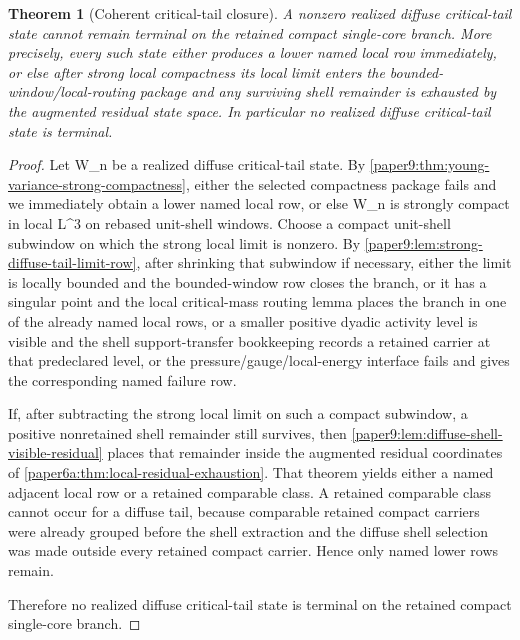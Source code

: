 \documentclass[11pt]{amsart}
\def\({}%
\def\){}%
\theoremstyle{plain}
\newtheorem{theorem}{Theorem}[section]
\theoremstyle{definition}
\theoremstyle{remark}
\begin{document}
\begin{theorem}[Coherent critical-tail closure]
\label{paper9:thm:coherent-critical-tail-closure}
A nonzero realized diffuse critical-tail state cannot remain terminal on the
retained compact single-core branch.  More precisely, every such state either
produces a lower named local row immediately, or else after strong local
compactness its local limit enters the bounded-window/local-routing package and
any surviving shell remainder is exhausted by the augmented residual state space.
In particular no realized diffuse critical-tail state is terminal.
\end{theorem}

\begin{proof}
Let \(W_n\) be a realized diffuse critical-tail state.  By
\cref{paper9:thm:young-variance-strong-compactness}, either the selected
compactness package fails and we immediately obtain a lower named local row, or
else \(W_n\) is strongly compact in local \(L^3\) on rebased unit-shell
windows.  Choose a compact unit-shell subwindow on which the strong local limit
is nonzero.  By \cref{paper9:lem:strong-diffuse-tail-limit-row}, after shrinking
that subwindow if necessary, either the limit is locally bounded and the
bounded-window row closes the branch, or it has a singular point and the local
critical-mass routing lemma places the branch in one of the already named local
rows, or a smaller positive dyadic activity level is visible and the shell
support-transfer bookkeeping records a retained carrier at that predeclared
level, or the pressure/gauge/local-energy interface fails and gives the
corresponding named failure row.

If, after subtracting the strong local limit on such a compact subwindow, a
positive nonretained shell remainder still survives, then
\cref{paper9:lem:diffuse-shell-visible-residual} places that remainder inside the
augmented residual coordinates of
\cref{paper6a:thm:local-residual-exhaustion}.  That theorem yields either a
named adjacent local row or a retained comparable class.  A retained comparable
class cannot occur for a diffuse tail, because comparable retained compact
carriers were already grouped before the shell extraction and the diffuse shell
selection was made outside every retained compact carrier.  Hence only named
lower rows remain.

Therefore no realized diffuse critical-tail state is terminal on the retained
compact single-core branch.
\end{proof}
\end{document}
